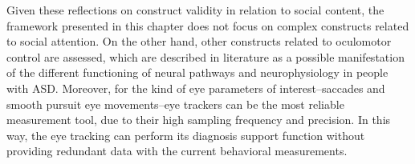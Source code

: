 Given these reflections on construct validity in relation to social content, the framework presented in this chapter does not focus on complex constructs related to social attention. On the other hand, other constructs related to oculomotor control are assessed, which are described in literature as a possible manifestation of the different functioning of neural pathways and neurophysiology in people with ASD. Moreover, for the kind of eye parameters of interest–saccades and smooth pursuit eye movements–eye trackers can be the most reliable measurement tool, due to their high sampling frequency and precision. In this way, the eye tracking can perform its diagnosis support function without providing redundant data with the current behavioral measurements.
